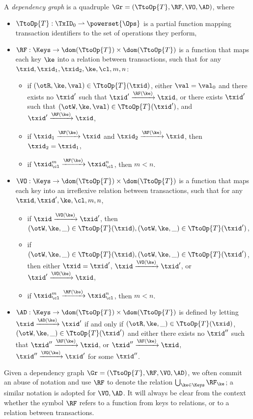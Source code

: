 \begin{definition}
A \emph{dependency graph} is a quadruple $\Gr = (\TtoOp{T}, \RF, \VO, \AD)$, where
\begin{itemize}
\item $\TtoOp{T}: \TxID_{0} \rightharpoonup \powerset{\Ops}$ is a partial function 
mapping transaction identifiers to the set of operations they perform, 
\item $\RF : \Keys \rightarrow \dom(\TtoOp{T}) \times \dom(\TtoOp{T})$ is a function that 
maps each key $\ke$ into a relation between transactions, such that for any $\txid, \txid_1, \txid_2, 
\ke, \cl, m, n$: 
\begin{itemize}
\item if $(\otR, \ke, \val) \in \TtoOp{T}(\txid)$, either $\val = \val_0$ 
and there exists no $\txid'$ such that $\txid' \xrightarrow{\RF(\ke)} \txid$,  
or there exists $\txid'$ such that $(\otW, \ke, \val) \in \TtoOp{T}(\txid')$, and $\txid' \xrightarrow{\RF(\ke)} \txid$, 
\item if $\txid_1 \xrightarrow{\RF(\ke)} \txid$ and $\txid_2 \xrightarrow{\RF(\ke)} \txid$, then 
$\txid_2 = \txid_1$, 
\item if $\txid_{\cl}^{m} \xrightarrow{\RF(\ke)} \txid_{\cl}^{n}$, then $m < n$.
\end{itemize}
\item $\VO: \Keys \rightarrow \dom(\TtoOp{T}) \times \dom(\TtoOp{T})$ is a function 
that maps each key into an irreflexive relation between transactions, such that for any $\txid, \txid', \ke, \cl, m, n$, 
\begin{itemize}
\item if $\txid \xrightarrow{\VO(\ke)} \txid'$, then $(\otW, \ke, \_) \in \TtoOp{T}(\txid), (\otW, \ke, \_) \in \TtoOp{T}(\txid')$, 
\item if $(\otW, \ke, \_) \in \TtoOp{T}(\txid), (\otW, \ke, \_) \in \TtoOp{T}(\txid')$, then either $\txid = \txid'$, 
$\txid \xrightarrow{\VO(\ke)} \txid'$, or $\txid' \xrightarrow{\VO(\ke)} \txid$, 
\item if $\txid_{\cl}^{m} \xrightarrow{\RF(\ke)} \txid_{\cl}^{n}$, then $m < n$.
\end{itemize}
\item $\AD: \Keys \rightarrow \dom(\TtoOp{T}) \times \dom(\TtoOp{T})$ is defined 
by letting $\txid \xrightarrow{\AD(\ke)} \txid'$ if and only if $(\otR, \ke, \_) \in \TtoOp{T}(\txid)$, 
$(\otW, \ke, \_) \in \TtoOp{T}(\txid')$ and 
either there exists no $\txid''$ such that $\txid'' \xrightarrow{\RF(\ke)} \txid$, or 
$\txid'' \xrightarrow{\RF(\ke)} \txid$, $\txid'' \xrightarrow{\VO(\ke)} \txid'$ for 
some $\txid''$.
\end{itemize}
\end{definition}
Given a dependency graph $\Gr = (\TtoOp{T}, \RF, \VO, \AD)$, we often 
commit an abuse of notation and use $\RF$ to denote the relation 
$\bigcup_{\ke \in \Keys} \RF_{\ke}$; a similar notation is adopted for $\VO, \AD$. 
It will always be clear from the context whether the symbol $\RF$ refers to a function 
from keys to relations, or to a relation between transactions. 

